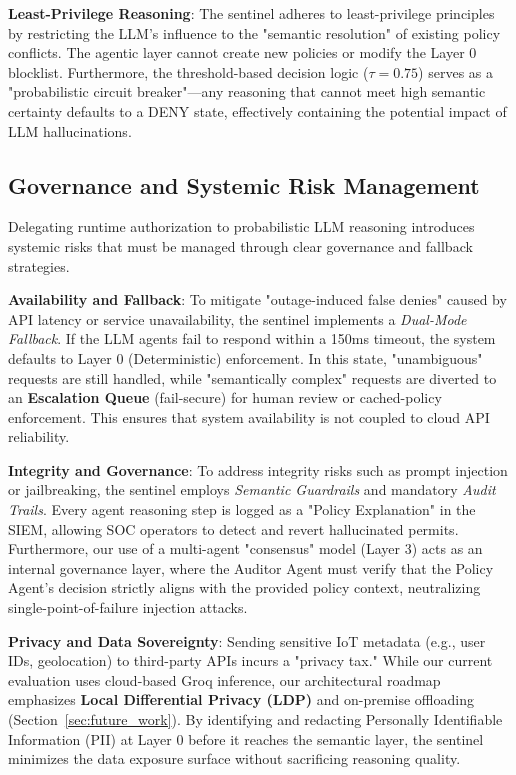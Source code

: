 \documentclass[conference]{IEEEtran}
\begin{document}
\textbf{Least-Privilege Reasoning}: The sentinel adheres to least-privilege principles by restricting the LLM's influence to the "semantic resolution" of existing policy conflicts. The agentic layer cannot create new policies or modify the Layer 0 blocklist. Furthermore, the threshold-based decision logic ($\tau = 0.75$) serves as a "probabilistic circuit breaker"---any reasoning that cannot meet high semantic certainty defaults to a DENY state, effectively containing the potential impact of LLM hallucinations.

\subsection{Governance and Systemic Risk Management}

Delegating runtime authorization to probabilistic LLM reasoning introduces systemic risks that must be managed through clear governance and fallback strategies.

\textbf{Availability and Fallback}: To mitigate "outage-induced false denies" caused by API latency or service unavailability, the sentinel implements a \textit{Dual-Mode Fallback}. If the LLM agents fail to respond within a 150ms timeout, the system defaults to Layer 0 (Deterministic) enforcement. In this state, "unambiguous" requests are still handled, while "semantically complex" requests are diverted to an \textbf{Escalation Queue} (fail-secure) for human review or cached-policy enforcement. This ensures that system availability is not coupled to cloud API reliability.

\textbf{Integrity and Governance}: To address integrity risks such as prompt injection or jailbreaking, the sentinel employs \textit{Semantic Guardrails} and mandatory \textit{Audit Trails}. Every agent reasoning step is logged as a "Policy Explanation" in the SIEM, allowing SOC operators to detect and revert hallucinated permits. Furthermore, our use of a multi-agent "consensus" model (Layer 3) acts as an internal governance layer, where the Auditor Agent must verify that the Policy Agent's decision strictly aligns with the provided policy context, neutralizing single-point-of-failure injection attacks.

\textbf{Privacy and Data Sovereignty}: Sending sensitive IoT metadata (e.g., user IDs, geolocation) to third-party APIs incurs a "privacy tax." While our current evaluation uses cloud-based Groq inference, our architectural roadmap emphasizes \textbf{Local Differential Privacy (LDP)} and on-premise offloading (Section~\ref{sec:future_work}). By identifying and redacting Personally Identifiable Information (PII) at Layer 0 before it reaches the semantic layer, the sentinel minimizes the data exposure surface without sacrificing reasoning quality.
\end{document}
